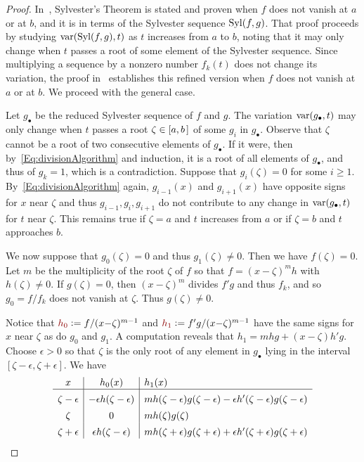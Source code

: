 \documentclass[12pt]{amsart}
\theoremstyle{definition}
\DeclareMathOperator{\var}{{\rm var}}
\DeclareMathOperator{\Syl}{{\rm Syl}}
\newcommand{\defcolor}[1]{{\color{TAMU}#1}}
\begin{document}
\begin{proof}
  In~\cite[Thm.\ 2.55]{BPR}, Sylvester's Theorem is stated and proven 
  when $f$ does not vanish at $a$ or at $b$, and it is in terms of the Sylvester sequence $\Syl(f,g)$.
  That proof proceeds by studying $\var(\Syl(f,g), t)$ as $t$ increases from $a$ to $b$, noting that it may only
  change when $t$ passes a root of some element of the Sylvester sequence.
  Since multiplying a sequence by a nonzero number $f_k(t)$ does not change its variation, the proof in~\cite{BPR}
  establishes this refined  version when $f$ does not vanish at $a$ or at $b$.
  We proceed with the general case.

  Let $g_\bullet$ be the reduced Sylvester sequence of $f$ and $g$.
  The variation $\var(g_\bullet,t)$ may only change when $t$ passes a root $\zeta\in[a,b\hspace{.05cm}]$ of some $g_i$ in
  $g_\bullet$. 
  Observe that $\zeta$ cannot be a root of two consecutive elements of $g_\bullet$.
  If it were, then by~\eqref{Eq:divisionAlgorithm} and induction, it is a root of all elements of $g_\bullet$, and thus of
  $g_k=1$, which is a contradiction.
  Suppose that $g_i(\zeta)=0$ for some $i\geq 1$.
  By~\eqref{Eq:divisionAlgorithm} again, $g_{i-1}(x)$ and $g_{i+1}(x)$ have opposite signs for $x$ near $\zeta$ and thus
  $g_{i-1},g_i,g_{i+1}$ do not contribute to any change in $\var(g_\bullet,t)$ for $t$ near $\zeta$.
  This remains true if $\zeta=a$ and $t$ increases from $a$ or if $\zeta=b$ and $t$ approaches $b$.

  We now suppose that $g_0(\zeta)=0$ and thus $g_1(\zeta)\neq 0$.
  Then we have $f(\zeta)=0$.
  Let $m$ be the multiplicity of the root $\zeta$ of $f$ so that $f=(x{-}\zeta)^m h$ with $h(\zeta)\neq 0$.
  If $g(\zeta)=0$, then $(x{-}\zeta)^m$ divides $f'g$ and thus $f_k$, and so $g_0=f/f_k$ does not vanish at $\zeta$.
  Thus $g(\zeta)\neq 0$.

  Notice that $\defcolor{h_0}\vcentcolon=f/(x{-}\zeta)^{m-1}$ and $\defcolor{h_1}\vcentcolon=f'g/(x{-}\zeta)^{m-1}$ have the same signs for
  $x$ near $\zeta$ as do $g_0$ and $g_1$.
  A computation reveals that $h_1=mhg+(x{-}\zeta)h'g$.
 Choose $\epsilon>0$ so that $\zeta$ is the only root of any element in $g_\bullet$ lying in the interval
 $[\zeta-\epsilon,\zeta+\epsilon]$.
 We have
 \[
 \begin{array}{c|c|l}
   x & h_0(x) & h_1(x)\\\hline
   \zeta-\epsilon & -\epsilon h(\zeta-\epsilon)  &
        mh(\zeta-\epsilon)g(\zeta-\epsilon) - \epsilon h'(\zeta-\epsilon)g(\zeta-\epsilon)  \rule{0pt}{13pt}\\
   \zeta     &     0    &   mh(\zeta)g(\zeta)  \rule{0pt}{13pt}\\
   \zeta+\epsilon & \epsilon h(\zeta-\epsilon)  &
        mh(\zeta+\epsilon)g(\zeta+\epsilon) + \epsilon h'(\zeta+\epsilon)g(\zeta+\epsilon)  \rule{0pt}{13pt}
 \end{array}
 \]
 

\end{proof}
\end{document}
